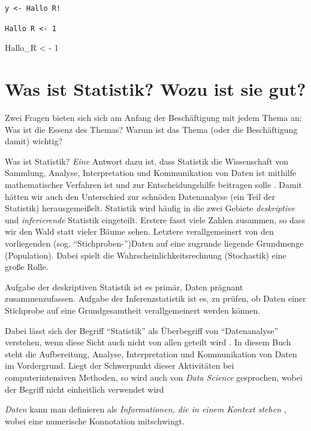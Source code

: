 \documentclass[12pt,ngerman,]{book}
\newenvironment{Shaded}{\begin{snugshade}}{\end{snugshade}}
\newcommand{\DecValTok}[1]{\textcolor[rgb]{0.00,0.00,0.81}{{#1}}}
\newcommand{\StringTok}[1]{\textcolor[rgb]{0.31,0.60,0.02}{{#1}}}
\newcommand{\NormalTok}[1]{{#1}}
\renewenvironment{Shaded}{\begin{kframe}}{\end{kframe}}
\begin{document}
\texttt{y\ \textless{}-\ Hallo\ R!}

\texttt{Hallo\ R\ \textless{}-\ 1}

\begin{Shaded}
\begin{Highlighting}[]
\NormalTok{Hallo_R <}\StringTok{ }\NormalTok{-}\StringTok{ }\DecValTok{1}
\end{Highlighting}
\end{Shaded}

\section{Was ist Statistik? Wozu ist sie
gut?}\label{was-ist-statistik-wozu-ist-sie-gut}

Zwei Fragen bieten sich sich am Anfang der Beschäftigung mit jedem Thema
an: Was ist die Essenz des Themas? Warum ist das Thema (oder die
Beschäftigung damit) wichtig?

Was ist Statistik? \emph{Eine} Antwort dazu ist, dass Statistik die
Wissenschaft von Sammlung, Analyse, Interpretation und Kommunikation von
Daten ist mithilfe mathematischer Verfahren ist und zur
Entscheidungshilfe beitragen solle \citep{oxford, sep-statistics}. Damit
hätten wir auch den Unterschied zur schnöden Datenanalyse (ein Teil der
Statistik) herausgemeißelt. Statistik wird häufig in die zwei Gebiete
\emph{deskriptive} und \emph{inferierende} Statistik eingeteilt. Erstere
fasst viele Zahlen zusammen, so dass wir den Wald statt vieler Bäume
sehen. Letztere verallgemeinert von den vorliegenden (sog.
``Stichproben-'')Daten auf eine zugrunde liegende Grundmenge
(Population). Dabei spielt die Wahrscheinlichkeitsrechnung (Stochastik)
eine große Rolle.

Aufgabe der deskriptiven Statistik ist es primär, Daten prägnant
zusammenzufassen. Aufgabe der Inferenzstatistik ist es, zu prüfen, ob
Daten einer Stichprobe auf eine Grundgesamtheit verallgemeinert werden
können.

Dabei lässt sich der Begriff ``Statistik'' als Überbegriff von
``Datenanalyse'' verstehen, wenn diese Sicht auch nicht von allen
geteilt wird \citep{grolemund2014cognitive}. In diesem Buch steht die
Aufbereitung, Analyse, Interpretation und Kommunikation von Daten im
Vordergrund. Liegt der Schwerpunkt dieser Aktivitäten bei
computerintensiven Methoden, so wird auch von \emph{Data Science}
gesprochen, wobei der Begriff nicht einheitlich verwendet wird
\citep{r4ds, hardin2015data}

\emph{Daten} kann man definieren als \emph{Informationen, die in einem
Kontext stehen} \citep{moore1990uncertainty}, wobei eine numerische
Konnotation mitschwingt.
\end{document}
